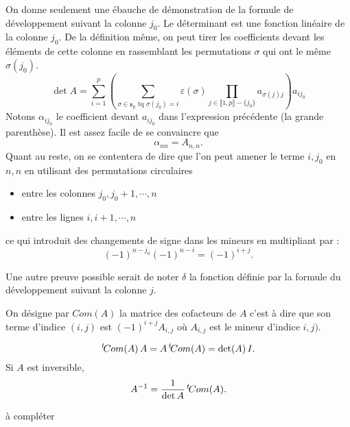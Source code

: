 \begin{demo}
On donne seulement une ébauche de démonstration de la formule de développement suivant la colonne $j_0$.\newline
Le déterminant est une fonction linéaire de la colonne $j_0$. De la définition même, on peut tirer les coefficients devant les éléments de cette colonne en rassemblant les permutations $\sigma$ qui ont le même $\sigma(j_0)$.
 \begin{displaymath}
 \det A =
\sum_{i=1}^p
\left( \sum_{
 \sigma \in \mathfrak s_p \text{ tq } \sigma(j_0)=i
}\varepsilon(\sigma)\prod_{j\in \llbracket 1, p \rrbracket-\{j_0\}}a_{\sigma(j)j}\right) a_{ij_0}
\end{displaymath}
Notons $\alpha_{ij_0}$ le coefficient devant $a_{ij_0}$ dans l'expression précédente (la grande parenthèse). Il est assez facile de se convaincre que 
\begin{displaymath}
\alpha_{nn} = A_{n,n} .
\end{displaymath}
Quant au reste, on se contentera de dire que l'on peut amener le terme $i,j_0$ en $n,n$ en utilisant des permutations circulaires
\begin{itemize}
 \item entre les colonnes $j_0,j_0+1,\cdots,n$
\item entre les lignes $i,i+1,\cdots,n$
\end{itemize}
ce qui introduit des changements de signe dans les mineurs en multipliant par :
\begin{displaymath}
 (-1)^{n-j_0}(-1)^{n-i}=(-1)^{i+j}.
\end{displaymath}

Une autre preuve possible serait de noter $\delta$ la fonction définie par la formule du développement suivant la colonne $j$.
\end{demo}
\begin{defi}
On désigne par $Com(A)$ la matrice des cofacteurs de $A$ c'est à dire que son terme d'indice $(i,j)$ est $(-1)^{i+j}A_{i,j}$ où $A_{i,j}$ est le mineur d'indice $i,j)$. 
\end{defi}
\begin{propn}
 \begin{displaymath}
  \mathstrut^t\! Com(A)\,A = A\, \mathstrut^t\! Com(A) = \det(A)\,I.
 \end{displaymath}
Si $A$ est inversible,
\[
  A^{-1} = \frac{1}{\det A}\, \mathstrut^t\! Com(A). 
\]
\end{propn}
\begin{demo}
  à compléter
\end{demo}

